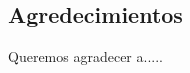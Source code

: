 \sloppy
\newpage
\thispagestyle{empty}

\begin{center}
\section*{Agredecimientos}
Queremos agradecer a.....
\end{center}
